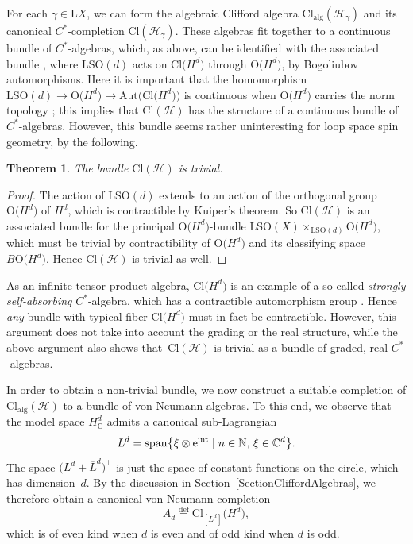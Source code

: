 \documentclass[10pt,a4paper]{amsart}
\numberwithin{equation}{section}
\newtheorem{Theorem}{Theorem}[section]
\newcommand{\N}{\mathbb{N}}
\newcommand{\C}{\mathbb{C}}
\newcommand{\Cl}{\mathrm{Cl}}
\newcommand{\SO}{\mathrm{SO}}
\newcommand{\Aut}{\mathrm{Aut}}
\renewcommand{\O}{\mathrm{O}}
\renewcommand{\L}{\mathrm{L}}
\newcommand{\defeq}{\stackrel{\mathrm{def}}{=}}
\begin{document}
For each $\gamma \in \L X$, we can form the algebraic Clifford algebra $\Cl_{\mathrm{alg}}(\mathcal{H}_\gamma)$ and its canonical $C^*$-completion $\Cl(\mathcal{H}_\gamma)$.
These algebras fit together to a continuous bundle of $C^*$-algebras, which, as above, can be identified with the associated bundle \smash{$\L \SO(X) \times_{\L\SO(d)} \Cl\big(H^d\big)$}, where $\L\SO(d)$ acts on $\Cl\big(H^d\big)$ through $\O\big(H^d\big)$, by Bogoliubov automorphisms.
Here it is important that the homomorphism $\L\SO(d) \to \O\big(H^d\big) \to \Aut\big(\Cl\big(H^d\big)\big)$ is continuous when $\O\big(H^d\big)$ carries the norm topology \cite[Proposition~4.35]{Ambler2012}; this implies that $\Cl(\mathcal{H})$ has the structure of a continuous bundle of $C^*$-algebras.
However, this bundle seems rather uninteresting for loop space spin geometry, by the following.

\begin{Theorem}
 The bundle $\Cl(\mathcal{H})$ is trivial.
\end{Theorem}

\begin{proof}
The action of $\L\SO(d)$ extends to an action of the orthogonal group $\O\big(H^d\big)$ of $H^d$, which is contractible by Kuiper's theorem.
So $\Cl(\mathcal{H})$ is an associated bundle for the principal $\O\big(H^d\big)$-bundle $\L\SO(X) \times_{\L\SO(d)} \O\big(H^d\big)$, which must be trivial by contractibility of $\O\big(H^d\big)$ and its classifying space $B\O\big(H^d\big)$.
Hence $\Cl(\mathcal{H})$ is trivial as well.
\end{proof}

\begin{Remark}
As an infinite tensor product algebra, $\Cl\big(H^d\big)$ is an example of a so-called \emph{strongly self-absorbing} $C^*$-algebra, which has a contractible automorphism group \cite{DardalatPennig,DardalatWinter}.
Hence \emph{any} bundle with typical fiber $\Cl\big(H^d\big)$ must in fact be contractible.
However, this argument does not take into account the grading or the real structure, while the above argument also shows that~$\Cl(\mathcal{H})$ is trivial as a bundle of graded, real $C^*$-algebras.
\end{Remark}

In order to obtain a non-trivial bundle, we now construct a suitable completion of $\Cl_{\mathrm{alg}}(\mathcal{H})$ to a bundle of von Neumann algebras.
To this end, we observe that the model space $H^d_\C$ admits a canonical sub-Lagrangian
\begin{equation}
\label{SubLagrangianLd}
 L^d = \mathrm{span}\big\{ \xi \otimes{\rm e}^{\rm int} \mid n \in \N, \, \xi \in \C^d\big\}.
\end{equation}
The space $\big(L^d + \overline{L}^d\big)^\perp$ is just the space of constant functions on the circle, which has dimension~$d$.
By the discussion in Section~\ref{SectionCliffordAlgebras}, we therefore obtain a canonical von Neumann completion
\begin{equation} \label{DefinitionAd}
A_d \defeq \Cl_{[L^d]}\big(H^d\big),
\end{equation}
which is of even kind when $d$ is even and of odd kind when $d$ is odd.
\end{document}
